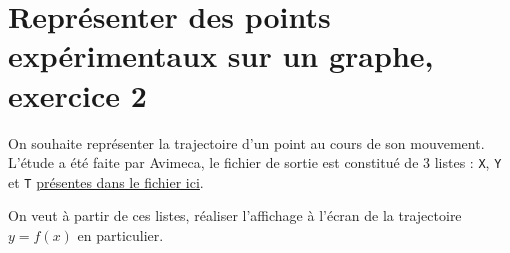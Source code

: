 \documentclass[11pt]{article}
\begin{document}
\newpage







\section{Représenter des points expérimentaux sur un graphe, exercice 2}





\medskip


On souhaite représenter la trajectoire d'un point au cours de son mouvement. L'étude a été faite par Avimeca, le fichier de sortie est constitué de 3 listes :  \texttt{X}, \texttt{Y} et \texttt{T} \href{https://github.com/formationPythonPC-Juin/aides-formation/blob/master/exercice2-aide.py}{\underline{présentes dans le fichier ici}}.

\smallskip
On veut à partir de ces listes, réaliser l'affichage à l'écran de la trajectoire $y = f(x)$ en particulier.

\medskip
\end{document}
